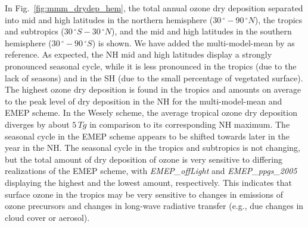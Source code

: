 \documentclass[gmd, manuscript]{copernicus}
\begin{document}
In Fig.~\ref{fig:mmm_drydep_hem}, the total annual ozone dry deposition separated into mid and high latitudes in the northern hemisphere ($30\,\unit{^\circ}-90\,\unit{^\circ N}$), the tropics and subtropics ($30\,\unit{^\circ S}-30\,\unit{^\circ N}$), and the mid and high latitudes in the southern hemisphere ($30\,\unit{^\circ}-90\,\unit{^\circ S}$) is shown. We have added the multi-model-mean by \citet{ACP:Hardacre2015} as reference. As expected, the NH mid and high latitudes display a strongly pronounced seasonal cycle, while it is less pronounced in the tropics (due to the lack of seasons) and in the SH (due to the small percentage of vegetated surface). The highest ozone dry deposition is found in the tropics and amounts on average to the  peak level of dry deposition in the NH for the multi-model-mean \citep{ACP:Hardacre2015} and EMEP scheme. In the Wesely scheme, the average tropical ozone dry deposition diverges by about $5\,\unit{Tg}$ in comparison to its corresponding NH maximum. The seasonal cycle in the EMEP scheme appears to be shifted towards later in the year in the NH. The seasonal cycle in the tropics and subtropics is not changing, but the total amount of dry deposition of ozone is very sensitive to differing realizations of the EMEP scheme, with \emph{EMEP\_offLight} and \emph{EMEP\_ppgs\_2005} displaying the highest and the lowest amount, respectively. This indicates that surface ozone in the tropics may be very sensitive to changes in emissions of ozone precursors and changes in long-wave radiative transfer (e.g., due changes in cloud cover or aerosol).
\end{document}
